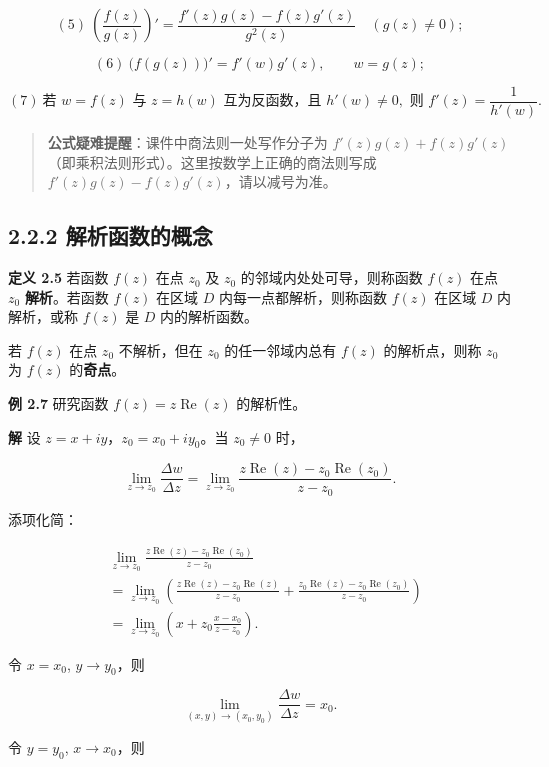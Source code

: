\[
(5)\ \left(\frac{f(z)}{g(z)}\right)'=\frac{f'(z)g(z)-f(z)g'(z)}{g^2(z)}\quad (g(z)\neq 0);
\]

\[
(6)\ \bigl(f(g(z))\bigr)'=f'(w)g'(z),\qquad w=g(z);
\]

\[
(7)\ \text{若 }w=f(z)\text{ 与 }z=h(w)\text{ 互为反函数，且 }h'(w)\neq 0,\text{ 则 }f'(z)=\frac{1}{h'(w)}.
\]

\begin{quote}
\textbf{公式疑难提醒}：课件中商法则一处写作分子为
\(f'(z)g(z)+f(z)g'(z)\)（即乘积法则形式）。这里按数学上正确的商法则写成
\(f'(z)g(z)-f(z)g'(z)\)，请以减号为准。
\end{quote}

\subsection{2.2.2
解析函数的概念}\label{ux89e3ux6790ux51fdux6570ux7684ux6982ux5ff5-1}

\textbf{定义 2.5} 若函数 \(f(z)\) 在点 \(z_0\) 及 \(z_0\)
的邻域内处处可导，则称函数 \(f(z)\) 在点 \(z_0\) \textbf{解析}。若函数
\(f(z)\) 在区域 \(D\) 内每一点都解析，则称函数 \(f(z)\) 在区域 \(D\)
内解析，或称 \(f(z)\) 是 \(D\) 内的解析函数。

若 \(f(z)\) 在点 \(z_0\) 不解析，但在 \(z_0\) 的任一邻域内总有 \(f(z)\)
的解析点，则称 \(z_0\) 为 \(f(z)\) 的\textbf{奇点}。

\textbf{例 2.7} 研究函数 \(f(z)=z\operatorname{Re}(z)\) 的解析性。

\textbf{解} 设 \(z=x+iy\)，\(z_0=x_0+iy_0\)。当 \(z_0\neq 0\) 时，

\[
\lim_{z\to z_0}\frac{\Delta w}{\Delta z}
=\lim_{z\to z_0}\frac{z\operatorname{Re}(z)-z_0\operatorname{Re}(z_0)}{z-z_0}.
\]

添项化简：

\[
\begin{aligned}
&\lim_{z\to z_0}\frac{z\operatorname{Re}(z)-z_0\operatorname{Re}(z_0)}{z-z_0}\\
&=\lim_{z\to z_0}\left(\frac{z\operatorname{Re}(z)-z_0\operatorname{Re}(z)}{z-z_0}
+\frac{z_0\operatorname{Re}(z)-z_0\operatorname{Re}(z_0)}{z-z_0}\right)\\
&=\lim_{z\to z_0}\left(x+z_0\frac{x-x_0}{z-z_0}\right).
\end{aligned}
\]

令 \(x=x_0\), \(y\to y_0\)，则

\[
\lim_{(x,y)\to(x_0,y_0)}\frac{\Delta w}{\Delta z}=x_0 .
\]

令 \(y=y_0\), \(x\to x_0\)，则

